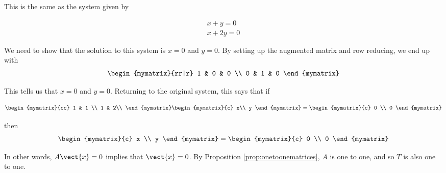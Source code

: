 \begin{solution}
This is the same as the system given by

\begin{equation*}
\begin{array}{c}
x + y = 0 \\
x + 2y = 0
\end{array}
\end{equation*}

We need to show that the solution to this system is $x = 0$ and $y = 0$. By setting up the augmented matrix and row reducing, we end up with
\begin{equation*} \begin{mymatrix}{rr|r}
1 & 0 & 0 \\
0 & 1 & 0
\end{mymatrix}
\end{equation*}

This tells us that $x = 0$ and $y = 0$. Returning to the original system, this says that if 

\begin{equation*}
\begin{mymatrix}{cc}
1 & 1 \\
1 & 2\\
\end{mymatrix}
\begin{mymatrix}{c}
x\\
y
\end{mymatrix}
=
\begin{mymatrix}{c}
0 \\
0
\end{mymatrix}
\end{equation*}

then 
\begin{equation*}
\begin{mymatrix}{c}
x \\
y
\end{mymatrix}
=
\begin{mymatrix}{c}
0 \\
0
\end{mymatrix}
\end{equation*}

In other words, $A\vect{x}=0$ implies that $\vect{x}=0$. By 
Proposition \ref{prop:onetoonematrices}, $A$ is one to one, and so $T$ is also one to one.


\end{solution}
